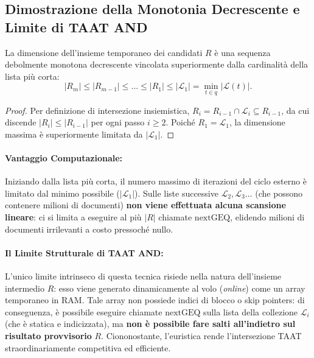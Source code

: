 \FloatBarrier
\subsection{Dimostrazione della Monotonia Decrescente e Limite di TAAT AND}

\begin{theorem}
La dimensione dell'insieme temporaneo dei candidati $R$ \`e una sequenza debolmente monotona decrescente vincolata superiormente dalla cardinalit\`a della lista pi\`u corta:
\begin{equation}
|R_m| \le |R_{m-1}| \le \dots \le |R_1| \le |\mathcal{L}_1| = \min_{t \in q} |\mathcal{L}(t)|.
\label{eq:monotonia-cardinalita}
\end{equation}
\end{theorem}
\begin{proof}
Per definizione di intersezione insiemistica, $R_i = R_{i-1} \cap \mathcal{L}_i \subseteq R_{i-1}$, da cui discende $|R_i| \le |R_{i-1}|$ per ogni passo $i \ge 2$. Poich\'e $R_1 = \mathcal{L}_1$, la dimensione massima \`e superiormente limitata da $|\mathcal{L}_1|$.
\end{proof}

\paragraph{Vantaggio Computazionale:}
Iniziando dalla lista pi\`u corta, il numero massimo di iterazioni del ciclo esterno \`e limitato dal minimo possibile ($|\mathcal{L}_1|$). Sulle liste successive $\mathcal{L}_2, \mathcal{L}_3 \dots$ (che possono contenere milioni di documenti) \textbf{non viene effettuata alcuna scansione lineare}: ci si limita a eseguire al pi\`u $|R|$ chiamate $\text{nextGEQ}$, elidendo milioni di documenti irrilevanti a costo pressoch\'e nullo.

\paragraph{Il Limite Strutturale di TAAT AND:}
L'unico limite intrinseco di questa tecnica risiede nella natura dell'insieme intermedio $R$: esso viene generato dinamicamente al volo (\textit{online}) come un array temporaneo in RAM. Tale array non possiede indici di blocco o skip pointers: di conseguenza, \`e possibile eseguire chiamate $\text{nextGEQ}$ sulla lista della collezione $\mathcal{L}_i$ (che \`e statica e indicizzata), ma \textbf{non \`e possibile fare salti all'indietro sul risultato provvisorio} $R$. Ciononostante, l'euristica rende l'intersezione TAAT straordinariamente competitiva ed efficiente.

